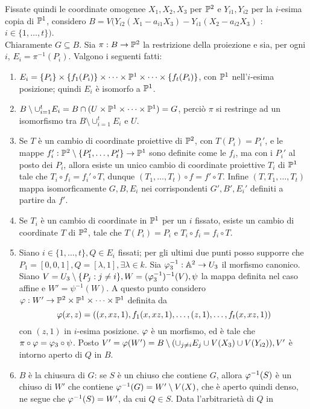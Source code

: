     Fissate quindi le coordinate omogenee $X_1, X_2, X_3$ per $\P^2$ e $Y_{i1}, Y_{i2}$ per la $i$-esima copia di $\P^1$, considero $B = V(Y_{i2} (X_1-a_{i1}X_3) - Y_{i1}(X_2-a_{i2}X_3)$ : $ i \in \{1,\ldots,t\})$.\\
    Chiaramente $G \subseteq B$. Sia $\pi : B \to \P^2$ la restrizione della proiezione e sia, per ogni $i$, $E_i = \pi^{-1}(P_i)$. Valgono i seguenti fatti: \begin{enumerate}
        \item $E_i = \{P_i\} \times \{f_1(P_i)\} \times \cdots \times \P^1 \times \cdots \times \{f_t(P_i)\}$, con $\P^1$ nell'$i$-esima posizione; quindi $E_i$ è isomorfo a $\P^1$.
        \item $B \setminus \cup_{i=1}^t E_i = B \cap (U \times \P^1 \times \cdots \times \P^1) = G$, perciò $\pi$ si restringe ad un isomorfismo tra $B \setminus \cup_{i=1}^t E_i$ e $U$.
        \item Se $T$ è un cambio di coordinate proiettive di $\P^2$, con $T(P_i) = P_i'$, e le mappe $f_i' : \P^2 \setminus \{P_1', \ldots, P_t'\} \to \P^1$ sono definite come le $f_i$, ma con i $P_i'$ al posto dei $P_i$, allora esiste un unico cambio di coordinate 
        proiettive $T_i$ di $\P^1$ tale che $T_i \circ f_i = f_i' \circ T$, dunque $(T_1,\ldots,T_t) \circ f = f' \circ T$. Infine $(T,T_1,\ldots,T_t)$ mappa isomorficamente $G,B,E_i$ nei corrispondenti $G',B',E_i'$ definiti a partire da $f'$.
        \item Se $T_i$ è un cambio di coordinate in $\P^1$ per un $i$ fissato, esiste un cambio di coordinate $T$ di $\P^2$, tale che $T(P_i) = P_i$ e $T_i \circ f_i = f_i \circ T$.
        \item Siano $i \in \{1,\ldots,t\}, Q \in E_i$ fissati; per gli ultimi due punti posso supporre che $P_1 = [0,0,1], Q = [\lambda,1], \exists \lambda \in k$. Sia $\gvf_3^{-1} : \A^2 \to U_3$ il morfismo canonico. Siano $V = U_3 \setminus \{P_j : j \neq i\}, W = (\gvf_3^{-1})^{-1}(V), 
        \psi$ la mappa definita nel caso affine e $W' = \psi^{-1}(W)$. A questo punto considero $\gvf : W' \to \P^2 \times \P^1 \times \cdots \times \P^1$ definita da $$\gvf(x,z) = ((x,xz,1), f_1(x,xz,1), \ldots,(z,1),\ldots,f_t(x,xz,1))$$ con $(z,1)$ in $i$-esima posizione. 
        $\gvf$ è un morfismo, ed è tale che $\pi \circ \gvf = \gvf_3 \circ \psi$. Posto $V' = \gvf(W') = B \setminus (\cup_{j \neq i} E_j \cup V(X_3) \cup V(Y_{i2})), V'$ è intorno aperto di $Q$ in $B$.
        \item $B$ è la chiusura di $G$: se $S$ è un chiuso che contiene $G$, allora $\gvf^{-1}(S)$ è un chiuso di $W'$ che contiene $\gvf^{-1}(G) = W' \setminus V(X)$, che è aperto quindi denso, ne segue che $\gvf^{-1}(S) = W'$, da cui $Q \in S$. Data l'arbitrarietà di $Q$ in 

\end{enumerate}
